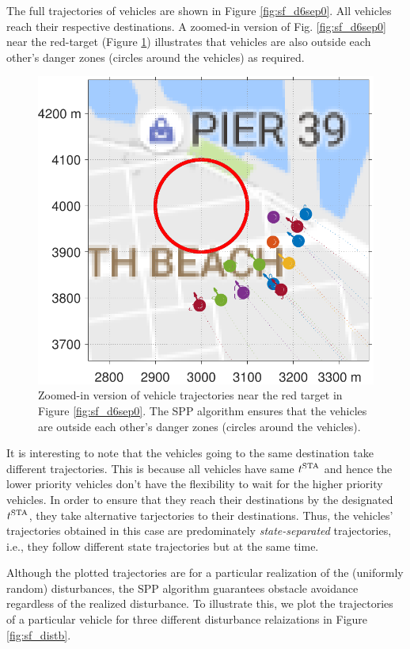 The full trajectories of vehicles are shown in Figure \ref{fig:sf_d6sep0}. All vehicles reach their respective destinations. A zoomed-in version of Fig. \ref{fig:sf_d6sep0} near the red-target (Figure \ref{fig:sf_d6sep0_zoomed}) illustrates that vehicles are also outside each other's danger zones (circles around the vehicles) as required. 
%
\begin{figure}[h]
  \centering
  \includegraphics[width=\columnwidth]{figs/sf_d6sep0_zoomed}
  \caption{Zoomed-in version of vehicle trajectories near the red target in Figure \ref{fig:sf_d6sep0}. The SPP algorithm ensures that the vehicles are outside each other's danger zones (circles around the vehicles).} 
  \label{fig:sf_d6sep0_zoomed}
\end{figure}
It is interesting to note that the vehicles going to the same destination take different trajectories. This is because all vehicles have same $t^\text{STA}$ and hence the lower priority vehicles don't have the flexibility to wait for the higher priority vehicles. In order to ensure that they reach their destinations by the designated $t^\text{STA}$, they take alternative tarjectories to their destinations. Thus, the vehicles' trajectories obtained in this case are predominately \textit{state-separated} trajectories, i.e., they follow different state trajectories but at the same time. 

Although the plotted trajectories are for a particular realization of the (uniformly random) disturbances, the SPP algorithm guarantees obstacle avoidance regardless of the realized disturbance. To illustrate this, we plot the trajectories of a particular vehicle for three different disturbance relaizations in Figure \ref{fig:sf_distb}. 

